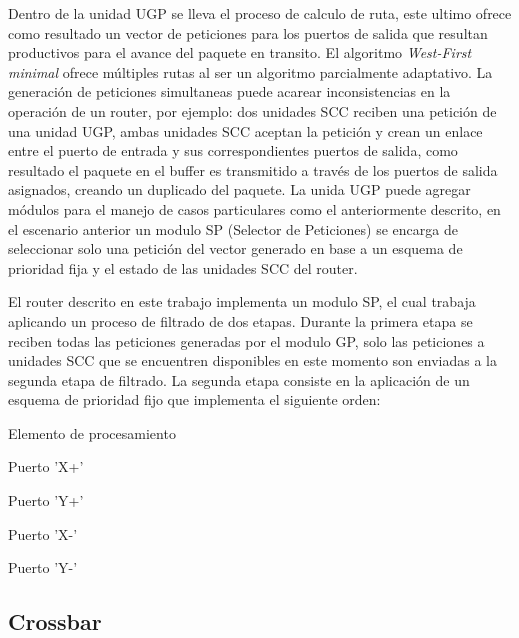 Dentro  de la unidad UGP se lleva el proceso de calculo de ruta, este ultimo ofrece como resultado un vector de peticiones para los puertos de salida que resultan productivos para el avance del paquete en transito. El algoritmo \textit{West-First minimal} ofrece múltiples rutas al ser un algoritmo parcialmente adaptativo. La generación de peticiones simultaneas puede acarear inconsistencias en la operación de un router, por ejemplo: dos unidades SCC reciben una petición de una unidad UGP, ambas unidades SCC aceptan la petición y crean un enlace entre el puerto de entrada y sus correspondientes puertos de salida, como resultado el paquete en el buffer es transmitido a través de los puertos de salida asignados, creando un duplicado del paquete. La unida UGP puede agregar módulos para el manejo de casos particulares como el anteriormente descrito, en el escenario anterior un modulo SP (Selector de Peticiones) se encarga de seleccionar solo una petición del vector generado en base a un esquema de prioridad fija y el estado de las unidades SCC del router.

El router descrito en este trabajo implementa un modulo SP, el cual trabaja aplicando un proceso de filtrado de dos etapas. Durante la primera etapa se reciben todas las peticiones generadas por el modulo GP, solo las peticiones a unidades SCC que se encuentren disponibles en este momento son enviadas a la segunda etapa de filtrado. La segunda etapa consiste en la aplicación de un esquema de prioridad fijo que implementa el siguiente orden:

\begin{enumerate*}
\item Elemento de procesamiento
\item Puerto 'X+'
\item Puerto 'Y+'
\item Puerto 'X-'
\item Puerto 'Y-'
\end{enumerate*}










\subsection{Crossbar}
	\label{Crossbar}

